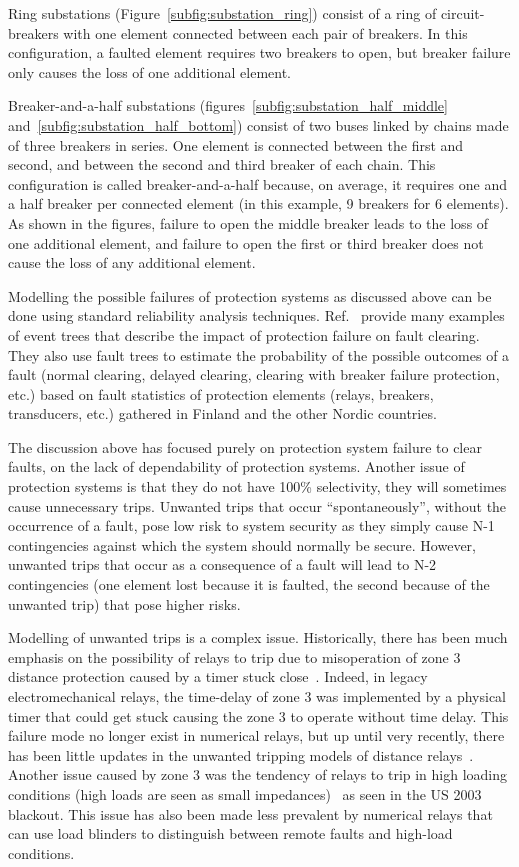 Ring substations (Figure~\ref{subfig:substation_ring}) consist of a ring of circuit-breakers with one element connected between each pair of breakers. In this configuration, a faulted element requires two breakers to open, but breaker failure only causes the loss of one additional element.

Breaker-and-a-half substations (figures~\ref{subfig:substation_half_middle} and~\ref{subfig:substation_half_bottom}) consist of two buses linked by chains made of three breakers in series. One element is connected between the first and second, and between the second and third breaker of each chain. This configuration is called breaker-and-a-half because, on average, it requires one and a half breaker per connected element (in this example, 9 breakers for 6 elements). As shown in the figures, failure to open the middle breaker leads to the loss of one additional element, and failure to open the first or third breaker does not cause the loss of any additional element.

Modelling the possible failures of protection systems as discussed above can be done using standard reliability analysis techniques. Ref.~\cite{GridPSA, Haarla} provide many examples of event trees that describe the impact of protection failure on fault clearing. They also use fault trees to estimate the probability of the possible outcomes of a fault (normal clearing, delayed clearing, clearing with breaker failure protection, etc.) based on fault statistics of protection elements (relays, breakers, transducers, etc.) gathered in Finland and the other Nordic countries.

The discussion above has focused purely on protection system failure to clear faults, \ie on the lack of dependability of protection systems. Another issue of protection systems is that they do not have 100\% selectivity, \ie they will sometimes cause unnecessary trips. Unwanted trips that occur ``spontaneously'', \ie without the occurrence of a fault, pose low risk to system security as they simply cause N-1 contingencies against which the system should normally be secure. However, unwanted trips that occur as a consequence of a fault will lead to N-2 contingencies (one element lost because it is faulted, the second because of the unwanted trip) that pose higher risks.

Modelling of unwanted trips is a complex issue. Historically, there has been much emphasis on the possibility of relays to trip due to misoperation of zone 3 distance protection caused by a timer stuck close~\cite{ZoneVulnerability, OriginalManchesterModel}. Indeed, in legacy electromechanical relays, the time-delay of zone 3 was implemented by a physical timer that could get stuck causing the zone 3 to operate without time delay. This failure mode no longer exist in numerical relays, but up until very recently, there has been little updates in the unwanted tripping models of distance relays~\cite{Alexandre_PMAPS}. Another issue caused by zone 3 was the tendency of relays to trip in high loading conditions (high loads are seen as small impedances)~\cite{3rdZoneRevisited} as seen in the US 2003 blackout. This issue has also been made less prevalent by numerical relays that can use load blinders to distinguish between remote faults and high-load conditions.

